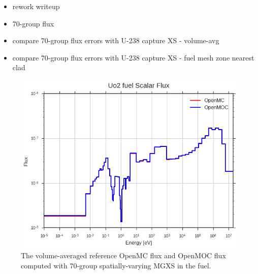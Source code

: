 \begin{itemize}
  \item rework writeup
  \item 70-group flux
  \item compare 70-group flux errors with U-238 capture XS - volume-avg
  \item compare 70-group flux errors with U-238 capture XS - fuel mesh zone nearest clad
\end{itemize}

\begin{figure}[h!]
  \centering
  \includegraphics[width=0.9\linewidth]{figures/biases/pin-cell/flux-uo2-fuel}
\caption[Spatially-varying scalar flux a 2D fuel pin.]{The volume-averaged reference OpenMC flux and OpenMOC flux computed with 70-group spatially-varying \ac{MGXS} in the fuel.}
\label{fig:chap2-pin-flux}
\end{figure}

